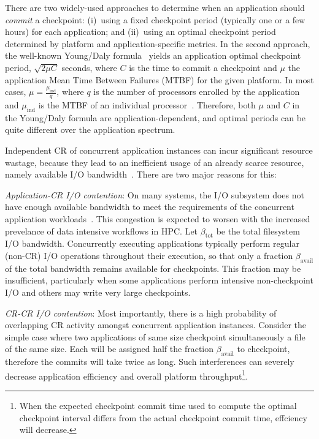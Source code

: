 \documentclass[two]{article}
\newcommand{\muind}{\mu_{\text{ind}}}
\newcommand{\bandtotal}{\beta_{\text{tot}}}
\newcommand{\bandavail}{\beta_{\text{avail}}}
\begin{document}
There are two widely-used approaches to determine when an application should
\emph{commit} a checkpoint: (i)~using a fixed checkpoint period (typically one
or a few hours) for each application; and (ii)~using an optimal
checkpoint period determined by platform and
application-specific metrics. In the
second approach, the well-known Young/Daly formula~\cite{young74,daly04} yields
an application optimal checkpoint period, $\sqrt{2 \mu C}$ seconds, where $C$
is the time to commit a checkpoint and $\mu$ the application Mean Time Between
Failures (MTBF) for the given platform.  In most cases, $\mu = \frac{\muind}{q}$,
where $q$ is the number of processors enrolled by the application and $\muind$
is the MTBF of an individual processor~\cite{springer-monograph}. Therefore,
both $\mu$ and $C$ in the Young/Daly formula are application-dependent, and
optimal periods can be quite different over the application spectrum.

Independent CR of concurrent application instances can incur significant
resource wastage, because they lead to an inefficient usage of an already
scarce resource, namely available I/O bandwidth~\cite{Luu:2015:Multiplatform}.
There are two major reasons for this:

\begin{compactitem}
        
\item \emph{Application-CR I/O contention}: On many systems, the I/O subsystem
does not have enough available bandwidth to meet the requirements of the
concurrent application workloads~\cite{Luu:2015:Multiplatform}. This congestion
is expected to worsen with the increased prevelance of data
intensive workflows in HPC.  Let $\bandtotal$ be the total filesystem I/O
bandwidth.  Concurrently executing applications typically perform regular
(non-CR) I/O operations throughout their execution, so that only a fraction
$\bandavail$ of the total bandwidth remains available for checkpoints.  This
fraction may be insufficient, particularly when some applications perform
intensive non-checkpoint I/O and others may write very large checkpoints.

\item \emph{CR-CR I/O contention}: Most importantly, there is a high
probability of overlapping CR activity amongst concurrent application
instances.  Consider the simple case where two applications of same size
checkpoint simultaneously a file of the same size. Each will be assigned half
the fraction $\bandavail$ to checkpoint, therefore the commits will take twice
as long. Such interferences can severely decrease application efficiency and
overall platform throughput\footnote{When the expected checkpoint commit time
used to compute the optimal checkpoint interval differs from the actual
checkpoint commit time, effciency will decrease.}.

\end{compactitem}
\end{document}
